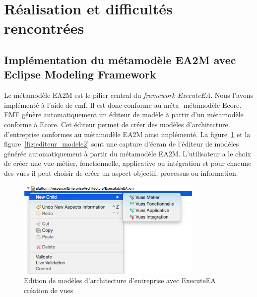 \section{Réalisation et difficultés rencontrées}

    \subsection{Implémentation du métamodèle EA2M avec Eclipse Modeling Framework}

    Le métamodèle EA2M est le pilier central du \emph{framework ExecuteEA}. Nous
    l'avons implémenté à l'aide de \gls{emf}. Il est donc conforme au méta-
    métamodèle Ecore. EMF génère automatiquement un éditeur de modèle à partir
    d'un métamodèle conforme à Ecore. Cet éditeur permet de créer des modèles
    d'architecture d'entreprise conformes au métamodèle EA2M ainsi implémenté.
    La figure~\ref{fig:editeur_modele1} et la figure~\ref{fig:editeur_modele2}
    sont une capture d'écran de l'éditeur de modèles générée automatiquement à
    partir du métamodèle EA2M. L'utilisateur a le choix de créer une vue métier,
    fonctionnelle, applicative ou intégration et pour chacune des vues il peut
    choisir de créer un aspect objectif, processus ou information.


    \begin{figure}[!htbp]
     \begin{center}
      \includegraphics[width=0.8\textwidth]{figures/5_implementation/editeur_modele1.png}
     \end{center}
     \caption{Edition de modèles d'architecture d'entreprise avec ExecuteEA\\création de vues}
     \label{fig:editeur_modele1}
    \end{figure}

